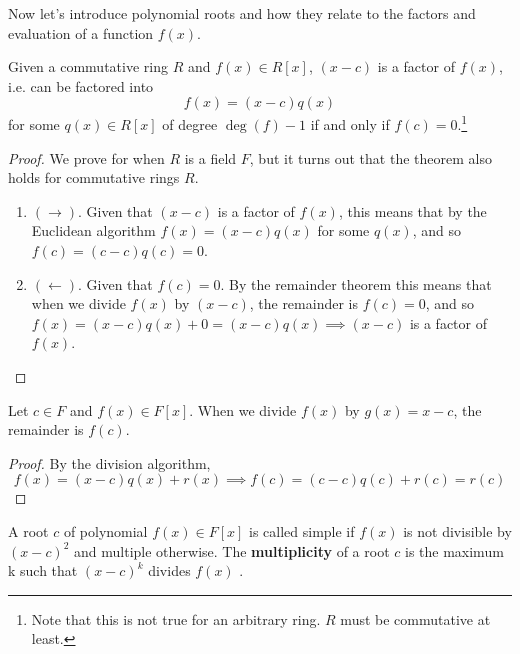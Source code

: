   Now let's introduce polynomial roots and how they relate to the factors and evaluation of a function $f(x)$. 

  \begin{corollary}
    Given a commutative ring $R$ and $f(x) \in R[x]$, $(x - c)$ is a factor of $f(x)$, i.e. can be factored into 
    \begin{equation}
      f(x) = (x - c) q(x) 
    \end{equation}
    for some $q(x) \in R[x]$ of degree $\deg(f) - 1$ if and only if $f(c) = 0$.\footnote{Note that this is not true for an arbitrary ring. $R$ must be commutative at least.}
  \end{corollary} 
  \begin{proof}
    We prove for when $R$ is a field $F$, but it turns out that the theorem also holds for commutative rings $R$. 
    \begin{enumerate}
      \item $(\rightarrow)$. Given that $(x - c)$ is a factor of $f(x)$, this means that by the Euclidean algorithm $f(x) = (x - c) q(x)$ for some $q(x)$, and so $f(c) = (c - c) q(c) = 0$. 
      \item $(\leftarrow)$. Given that $f(c) = 0$. By the remainder theorem this means that when we divide $f(x)$ by $(x - c)$, the remainder is $f(c) = 0$, and so $f(x) = (x - c) q(x) + 0 = (x - c) q(x) \implies (x - c)$ is a factor of $f(x)$. 
    \end{enumerate}
  \end{proof}

  \begin{corollary}
    Let $c \in F$ and $f(x) \in F[x]$. When we divide $f(x)$ by $g(x) = x - c$, the remainder is $f(c)$. 
  \end{corollary}
  \begin{proof}
    By the division algorithm, 
    \begin{equation}
      f(x) = (x - c) q(x) + r(x) \implies f(c) = (c - c) q(c) + r(c) = r(c)
    \end{equation}
  \end{proof} 

  \begin{definition}[Multiplicity]
    A root $c$ of polynomial $f(x) \in F[x]$ is called simple if $f(x)$ is not divisible by $(x - c)^2$ and multiple otherwise. The \textbf{multiplicity} of a root $c$ is the maximum k such that $(x - c)^k$ divides $f(x)$ .
  \end{definition} 

